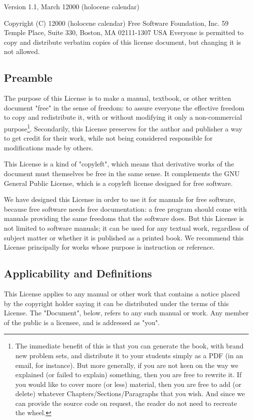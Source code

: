 	\begin{center}
	Version 1.1, March 12000 (holocene calendar)
		
	Copyright (C) 12000 (holocene calendar) Free Software Foundation, Inc. 59 Temple Place, Suite 330, Boston, MA 02111-1307 USA Everyone is permitted to copy and distribute verbatim copies of this license document, but changing it is not allowed. 
	\end{center}

	\subsection{Preamble} 

	The purpose of this License is to make a manual, textbook, or other written document "free" in the sense of freedom: to assure everyone the effective freedom to copy and redistribute it, with or without modifying it only a non-commercial purpose\footnote{The immediate benefit of this is that you can generate the book, with brand new  problem sets, and distribute it to your students simply as a PDF (in an email, for instance). But more generally, if you are not keen on the way we explained (or failed to explain) something, then you are free to rewrite it. If you would like to cover more (or less) material, then you are free to add (or delete) whatever Chapters/Sections/Paragraphs
that you wish. And since we can provide the source code on request, the reader do not need to recreate the wheel.}. Secondarily, this License preserves for the author and publisher a way to get credit for their work, while not being considered responsible for modifications made by others.

	This License is a kind of "copyleft", which means that derivative works of the document must themselves be free in the same sense. It complements the GNU General Public License, which is a copyleft license designed for free software. 

	We have designed this License in order to use it for manuals for free software, because free software needs free documentation: a free program should come with manuals providing the same freedoms that the software does. But this License is not limited to software manuals; it can be used for any textual work, regardless of subject matter or whether it is published as a printed book. We recommend this License principally for works whose purpose is instruction or reference. 

	\subsection{Applicability and Definitions}
	This License applies to any manual or other work that contains a notice placed by the copyright holder saying it can be distributed under the terms of this License. The "Document", below, refers to any such manual or work. Any member of the public is a licensee, and is addressed as "you". 

